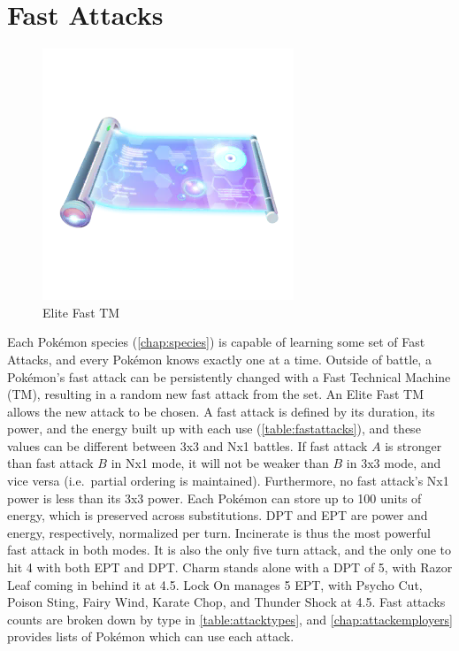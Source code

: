 \section{Fast Attacks}
\begin{figure}
  \center
  \includegraphics[width=.25\textwidth]{images/elitefasttm.png}
  \caption*{Elite Fast TM}
\end{figure}
Each Pokémon species (\autoref{chap:species}) is capable of learning some set of Fast Attacks, 
  and every Pokémon knows exactly one at a time.
Outside of battle, a Pokémon's fast attack can be persistently changed with a
  Fast Technical Machine (TM), resulting in a random new fast attack from the set.
An Elite Fast TM allows the new attack to be chosen.
A fast attack is defined by its duration, its power, and the energy built up with each use (\autoref{table:fastattacks}),
  and these values can be different between 3x3 and Nx1 battles.
If fast attack $A$ is stronger than fast attack $B$ in Nx1 mode, it will not be
  weaker than $B$ in 3x3 mode, and vice versa (i.e.\ partial ordering is maintained).
Furthermore, no fast attack's Nx1 power is less than its 3x3 power.
Each Pokémon can store up to 100 units of energy, which is preserved across substitutions.
DPT and EPT are power and energy, respectively, normalized per turn.
Incinerate is thus the most powerful fast attack in both modes.
It is also the only five turn attack, and the only one to hit 4 with both EPT and DPT\@.
Charm stands alone with a DPT of 5, with Razor Leaf coming in behind it at 4.5.
Lock On manages 5 EPT, with Psycho Cut, Poison Sting, Fairy Wind, Karate Chop,
  and Thunder Shock at 4.5.
Fast attacks counts are broken down by type in \autoref{table:attacktypes},
 and \autoref{chap:attackemployers} provides lists of Pokémon which can use each attack.



